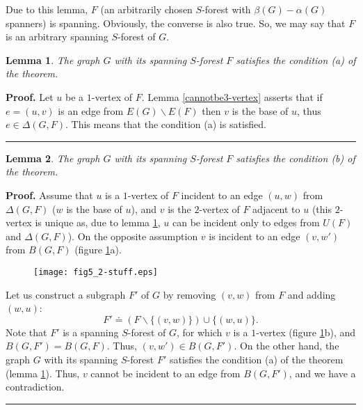 \documentclass[a4paper, 12pt]{article}
\newtheorem{lemma}{Lemma}[subsection]
\newenvironment{proof}[1][Proof]{\noindent\textbf{#1.} }{\ \rule{0.5em}{0.5em}}
\begin{document}
Due to this lemma, $F$ (an arbitrarily chosen $S$-forest with
$\beta(G) - \alpha(G)$ spanners) is spanning. Obviously, the
converse is also true. So, we may say that $F$ is an arbitrary
spanning $S$-forest of $G$.

\begin{lemma} \label{condition1}
The graph $G$ with its spanning $S$-forest $F$ satisfies the
condition (a) of the theorem.
\end{lemma}
\begin{proof}
Let $u$ be a $1$-vertex of $F$. Lemma \ref{cannotbe3-vertex} asserts
that if $e = (u,v)$ is an edge from $E(G) \backslash E(F)$ then $v$
is the base of $u$, thus $e \in \Delta(G, F)$. This means that the
condition (a) is satisfied.
\end{proof}

\begin{lemma} \label{condition2}
The graph $G$ with its spanning $S$-forest $F$ satisfies the
condition (b) of the theorem.
\end{lemma}
\begin{proof}
Assume that $u$ is a $1$-vertex of $F$ incident to an edge $(u, w)$
from $\Delta(G, F)$ ($w$ is the base of $u$), and $v$ is the
$2$-vertex of $F$ adjacent to $u$ (this $2$-vertex is unique as, due
to lemma \ref{condition1}, $u$ can be incident only to edges from
$U(F)$ and $\Delta(G, F)$). On the opposite assumption $v$ is
incident to an edge $(v, w')$ from $B(G, F)$ (figure
\ref{fig_2_stuff}a).

\begin{figure}[h]
\begin{center}
\texttt{[image: fig5\_2-stuff.eps]}\\
\caption{}\label{fig_2_stuff}
\end{center}
\end{figure}

Let us construct a subgraph $F'$ of $G$ by removing $(v, w)$ from
$F$ and adding $(w, u)$:
$$F' \doteq (F \backslash \{(v, w)\}) \cup \{(w, u)\}.$$
Note that $F'$ is a spanning $S$-forest of $G$, for which $v$ is a
$1$-vertex (figure \ref{fig_2_stuff}b), and $B(G, F') = B(G, F)$.
Thus, $(v, w') \in B(G, F')$. On the other hand, the graph $G$ with
its spanning $S$-forest $F'$ satisfies the condition (a) of the
theorem (lemma \ref{condition1}). Thus, $v$ cannot be incident to an
edge from $B(G, F')$, and we have a contradiction.
\end{proof}
\end{document}
